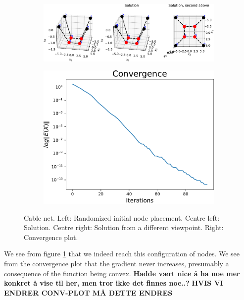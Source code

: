 \begin{figure}[!ht]
\centering
\begin{subfigure}{.72\textwidth}
  \centering
  \includegraphics[width=0.99\linewidth]{Bilder/p25.pdf}
\end{subfigure}%
\begin{subfigure}{.3\textwidth}
  \centering
  \includegraphics[width=0.99\linewidth]{Bilder/P25conv.pdf}
\end{subfigure}
\caption{Cable net. Left: Randomized initial node placement. Centre left: Solution. Centre right: Solution from a different viewpoint. Right: Convergence plot.}
\label{P25}
\end{figure}

We see from figure \ref{P25} that we indeed reach this configuration of nodes. We see from the convergence plot that the gradient never increases, presumably a consequence of the function being convex. \textbf{Hadde vært nice å ha noe mer konkret å vise til her, men tror ikke det finnes noe..?}
\textbf{HVIS VI ENDRER CONV-PLOT MÅ DETTE ENDRES} 

